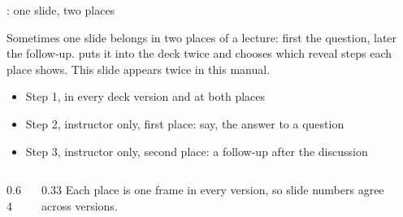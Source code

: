 
\begin{standardframe}{: one slide, two places}
	{\small Sometimes one slide belongs in two places of a lecture: first the
	question, later the follow-up.  puts it into the deck twice
	and chooses which reveal steps each place shows. This slide appears twice in
	this manual.\par}
	\smallskip
	\begin{itemize}
		\item Step 1, in every deck version and at both places
		\item<2-> Step 2, instructor only, first place: say, the answer to a question
		\item<3-> \textcolor{c_custom_red}{Step 3, instructor only, second place: a follow-up after the discussion}
	\end{itemize}
	\begin{columns}[T,onlytextwidth]
		\begin{column}{0.64\linewidth}
		\end{column}
		\begin{column}{0.33\linewidth}
			\small Each place is one frame in every version, so slide numbers agree across versions.\par
		\end{column}
	\end{columns}
\end{standardframe}
